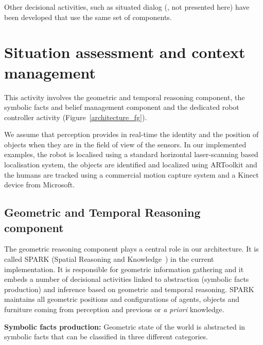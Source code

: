 \documentclass{svmult}
\begin{document}
Other decisional activities, such as situated dialog (\cite{Ros2010b,
  Lemaignan2011}, not presented here) have been developed that use the
same set of components.







\section{Situation assessment and context management}
\label{sec:situ}


This activity involves the geometric and temporal reasoning component,
the symbolic facts and belief management component and the dedicated
robot controller activity (Figure~\ref{architecture_fg}).

We assume that perception provides in real-time the identity and the
position of objects when they are in the field of view of the sensors.
In our implemented examples, the robot is localised using a standard
horizontal laser-scanning based localisation system, the objects are
identified and localized using ARToolkit \cite{ARToolkit} and the
humans are tracked using a commercial motion capture system and a
Kinect device from Microsoft.

\subsection{Geometric and Temporal Reasoning component}\label{sub:gtrc}

The geometric reasoning component plays a central role in our
architecture. It is called SPARK (Spatial Reasoning and
Knowledge~\cite{Sisbot2011}) in the current implementation. It is
responsible for geometric information gathering and it embeds a number
of decisional activities linked to abstraction (symbolic facts
production) and inference based on geometric and temporal reasoning.
SPARK maintains all geometric positions and configurations of agents,
objects and furniture coming from perception and previous or {\it a
  priori} knowledge.

\vspace{0.3cm}
\noindent
\textbf{Symbolic facts production:} 
Geometric state of the world is abstracted in symbolic facts that can
be classified in three different categories.
\end{document}
